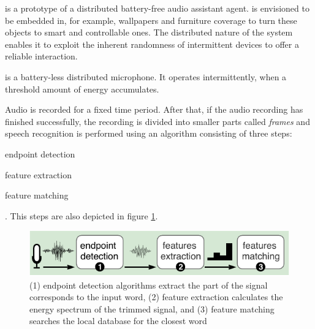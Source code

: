\sys is a prototype of a distributed battery-free audio assistant agent. \sys is envisioned to be embedded in, for example, wallpapers and furniture coverage to turn these objects to smart and controllable ones. The distributed nature of the \sys system enables it to exploit the inherent randomness of intermittent devices to offer a reliable interaction. 

\sys is a battery-less distributed microphone. It operates intermittently, when a threshold amount of energy accumulates.  

Audio is recorded for a fixed time period. After that, if the audio recording has finished successfully, the recording is divided into smaller parts called \textit{frames} and speech recognition is performed using an algorithm consisting of three steps:
\begin{enumerate*}
	\item endpoint detection
	\item feature extraction
	\item feature matching
\end{enumerate*}.
This steps are also depicted in figure \ref{fig:mic}.

\begin{figure}
	\centering
	\includegraphics[width=\columnwidth]{figures/distributedMicrophone}
	\caption{ (1) endpoint detection algorithms extract the part of the signal corresponds to the input word, (2) feature extraction calculates the energy spectrum of the trimmed signal, and (3) feature matching searches the local database for the closest word}
	\label{fig:mic}
\end{figure}


